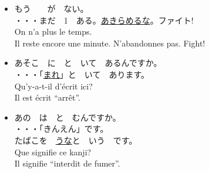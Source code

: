\documentclass{article}
\begin{document}
\begin{CJK*}{UTF8}{min}
\begin{itemize}
  \item もう　　が　ない。\\
    ・・・まだ　1　ある。\underline{あきらめるな}。ファイト!\\
    On n'a plus le temps.\\
    Il reste encore une minute. N'abandonnes pas. Fight!

  \item あそこ　に　と　いて　あるんですか。\\
    ・・・「\underline{まれ}」と　いて　あります。\\
    Qu'y-a-t-il d'\'ecrit ici?\\
    Il est \'ecrit ``arr\^et''.

  \item あの　は　と　むんですか。\\
    ・・・「きんえん」です。\\
    たばこを　\underline{うな}と　いう　です。\\
    Que signifie ce kanji?\\
    Il signifie ``interdit de fumer''.
  \end{itemize}

\end{CJK*}
\end{document}

